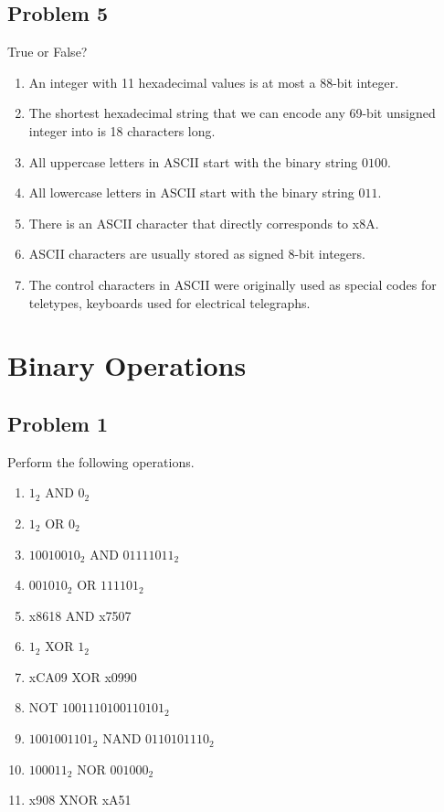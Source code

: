 \documentclass{article}
\begin{document}
\subsection*{Problem 5}
True or False?
\begin{enumerate}[label=\alph*.]
    \item An integer with 11 hexadecimal values is at most a 88-bit integer.
    \item The shortest hexadecimal string that we can encode any 69-bit unsigned integer into is 18 characters long.
    \item All uppercase letters in ASCII start with the binary string $0100$.
    \item All lowercase letters in ASCII start with the binary string $011$.
    \item There is an ASCII character that directly corresponds to x8A.
    \item ASCII characters are usually stored as signed 8-bit integers.
    \item The control characters in ASCII were originally used as special codes for teletypes, keyboards used for electrical telegraphs. 
\end{enumerate}

\newpage
\section*{Binary Operations} %

\subsection*{Problem 1}
Perform the following operations. 
\begin{enumerate}[label=\alph*.]
    \item $1_2$ AND $0_2$
    \item $1_2$ OR $0_2$
    \item $10010010_2$ AND $01111011_2$
    \item $001010_2$ OR $111101_2$
    \item x8618 AND x7507
    \item $1_2$ XOR $1_2$
    \item xCA09 XOR x0990
    \item NOT $1001110100110101_2$
    \item $1001001101_2$ NAND $0110101110_2$
    \item $100011_2$ NOR $001000_2$
    \item x908 XNOR xA51
\end{enumerate}
\end{document}
